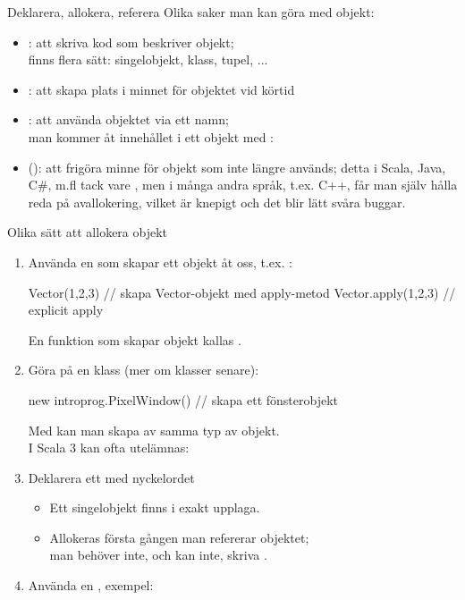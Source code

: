 \begin{Slide}{Deklarera, allokera, referera}
Olika saker man kan göra med objekt:
\begin{itemize}
  \item {}: att skriva kod som beskriver objekt; \\
  finns flera sätt: singelobjekt, klass, tupel, ...
  \item {}: att skapa plats i minnet för objektet vid körtid
  \item {}: att använda objektet via ett namn;\\
  man kommer åt innehållet i ett objekt med : \\
  \pause
  \item (): att frigöra minne för objekt som inte längre används;
  detta  i Scala, Java, C\#, m.fl tack vare , men i många andra språk,
  t.ex. C++, får man själv hålla reda på avallokering,
  vilket är knepigt och det blir lätt svåra buggar.
\end{itemize}
\end{Slide}


\begin{Slide}{Olika sätt att allokera objekt}\SlideFontSmall
\begin{enumerate}

\item Använda en  som skapar ett objekt åt oss, t.ex. :
\begin{Code}
Vector(1,2,3)  // skapa Vector-objekt med apply-metod
Vector.apply(1,2,3)  // explicit apply
\end{Code}
{\SlideFontTiny En funktion som skapar objekt kallas  .\vspace{0.5em}}
\pause
\item Göra  på en klass (mer om klasser senare):
\begin{Code}
new introprog.PixelWindow() // skapa ett fönsterobjekt
\end{Code}
{
\SlideFontSmall Med  kan man skapa  av samma typ av objekt.\\
I Scala 3 kan  ofta utelämnas: 
}
\pause
\item Deklarera ett  med nyckelordet 
\begin{itemize}\SlideFontSmall
  \item Ett singelobjekt finns i exakt  upplaga.
  \item Allokeras  första gången man refererar objektet; \\
  man behöver inte, och kan inte, skriva .
\end{itemize}
\pause
\item Använda en , exempel: 
\end{enumerate}
\end{Slide}

